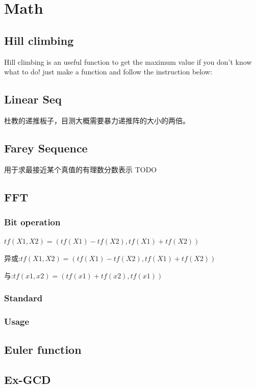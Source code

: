 \section{Math}
\subsection{Hill climbing}
Hill climbing is an useful function to get the maximum value if you don't know what to do!
just make a function and follow the instruction below:


\subsection{Linear Seq}
杜教的递推板子，目测大概需要暴力递推阵的大小的两倍。

\subsection{Farey Sequence}
用于求最接近某个真值的有理数分数表示
TODO

\subsection{FFT}
\subsubsection{Bit operation}
$tf(X1,X2) = (tf(X1) - tf(X2), tf(X1) + tf(X2))$

异或:$tf(X1,X2) = (tf(X1) - tf(X2), tf(X1) + tf(X2))$ 

与:$tf(x1,x2)=(tf(x1) + tf(x2), tf(x1))$

\subsubsection{Standard}

\subsubsection{Usage}


\subsection{Euler function}


\subsection{Ex-GCD}

